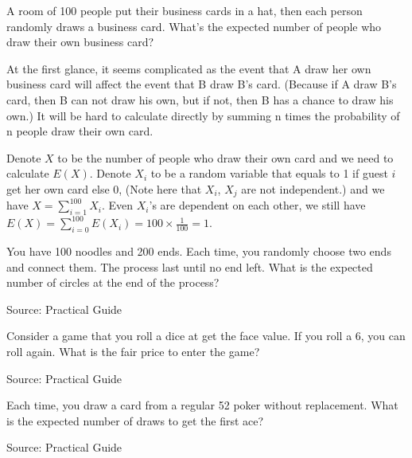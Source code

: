 \begin{exe}
A room of 100 people put their business cards in a hat, then each person randomly draws a business card. What's the expected number of people who draw their own business card?
\end{exe}
\begin{teacher}
\begin{sol}
At the first glance, it seems complicated as the event that A draw her own business card will affect the event that B draw B's card. (Because if A draw B's card, then B can not draw his own, but if not, then B has a chance to draw his own.) It will be hard to calculate directly by summing n times the probability of n people draw their own card.

Denote $X$ to be the number of people who draw their own card and we need to calculate $E(X)$. Denote $X_i$ to be a random variable that equals to 1 if guest $i$ get her own card else 0, (Note here that $X_i$, $X_j$ are not independent.) and we have $X=\sum_{i=1}^{100}X_i$. Even $X_i$'s are dependent on each other, we still have $E(X) = \sum_{i=0}^{100} E(X_i)= 100\times \frac{1}{100}=1$.
\end{sol}
\end{teacher}

\begin{exe}
You have 100 noodles and 200 ends. Each time, you randomly choose two ends and connect them. The process last until no end left. What is the expected number of circles at the end of the process?
\end{exe}
Source: Practical Guide
\begin{teacher}
\begin{sol}
\end{sol}
\end{teacher}

\begin{exe}
Consider a game that you roll a dice at get the face value. If you roll a 6, you can roll again. What is the fair price to enter the game?
\end{exe}
Source: Practical Guide
\begin{teacher}
\begin{sol}
\end{sol}
\end{teacher}

\begin{exe}
Each time, you draw a card from a regular 52 poker without replacement. What is the expected number of draws to get the first ace?
\end{exe}
Source: Practical Guide
\begin{teacher}
\begin{sol}
\end{sol}
\end{teacher}

